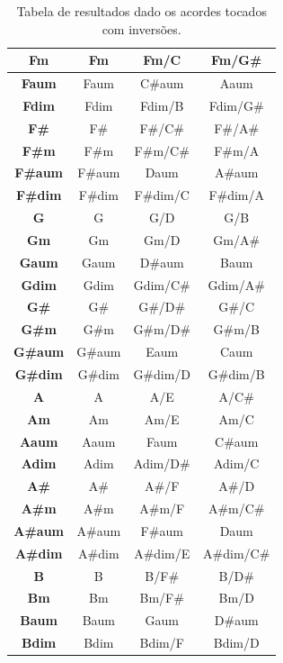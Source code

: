 \begin{table}[ht!]
{\begin{tabular}{ | c | c | c | c |}
    \hline
    \textbf{Fm} & Fm & Fm/C & Fm/G\# \\
    \hline
    \textbf{Faum} & Faum & C\#aum & Aaum \\
    \hline
    \textbf{Fdim} & Fdim & Fdim/B & Fdim/G\# \\
    \hline
    \textbf{F\#} & F\# & F\#/C\# & F\#/A\# \\
    \hline
    \textbf{F\#m} & F\#m & F\#m/C\# & F\#m/A \\
    \hline
    \textbf{F\#aum} & F\#aum & Daum & A\#aum \\
    \hline
    \textbf{F\#dim} & F\#dim & F\#dim/C & F\#dim/A \\
    \hline
    \textbf{G} & G & G/D & G/B \\
    \hline
    \textbf{Gm} & Gm & Gm/D & Gm/A\# \\
    \hline
    \textbf{Gaum} & Gaum & D\#aum & Baum \\
    \hline
    \textbf{Gdim} & Gdim & Gdim/C\# & Gdim/A\# \\
    \hline
    \textbf{G\#} & G\# & G\#/D\# & G\#/C \\
    \hline
    \textbf{G\#m} & G\#m & G\#m/D\# & G\#m/B \\
    \hline
    \textbf{G\#aum} & G\#aum & Eaum & Caum \\
    \hline
    \textbf{G\#dim} & G\#dim & G\#dim/D & G\#dim/B \\
    \hline
    \textbf{A} & A & A/E & A/C\# \\
    \hline
    \textbf{Am} & Am & Am/E & Am/C \\
    \hline
    \textbf{Aaum} & Aaum & Faum & C\#aum \\
    \hline
    \textbf{Adim} & Adim & Adim/D\# & Adim/C \\
    \hline
    \textbf{A\#} & A\# & A\#/F & A\#/D \\
    \hline
    \textbf{A\#m} & A\#m & A\#m/F & A\#m/C\# \\
    \hline
    \textbf{A\#aum} & A\#aum & F\#aum & Daum \\
    \hline
    \textbf{A\#dim} & A\#dim & A\#dim/E & A\#dim/C\# \\
    \hline
    \textbf{B} & B & B/F\# & B/D\# \\
    \hline
    \textbf{Bm} & Bm & Bm/F\# & Bm/D \\
    \hline
    \textbf{Baum} & Baum & Gaum & D\#aum \\
    \hline
    \textbf{Bdim} & Bdim & Bdim/F & Bdim/D \\
    \hline
  \end{tabular}
  }
  \caption{Tabela de resultados dado os acordes tocados com inversões.}
  \label{tab:label_test}
\end{table}

